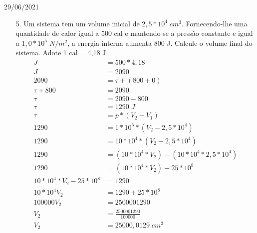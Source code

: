 \documentclass{SchoolBook}
\begin{document}
\begin{day}{29/06/2021}
\begin{enumerate}
            \item[5.] Um sistema tem um volume inicial de $2,5 * 10^4\;cm^3$. Fornecendo-lhe uma quantidade de calor igual a 500 cal e mantendo-se a pressão constante e igual a $1,0 * 10^5\;N/m^2$, a energia interna aumenta 800 J. Calcule o volume final do sistema. Adote 1 cal = 4,18 J.
            \begin{align*}
                                          J &= 500 * 4,18 \\
                                          J &= 2090       \\[3pt]
                                       2090 &= \tau + (800 + 0) \\
                                 \tau + 800 &= 2090             \\
                                       \tau &= 2090 - 800       \\
                                       \tau &= 1290\;J          \\[3pt]
                                       \tau &= p * (V_2 - V_1)                              \\
                                       1290 &= 1 * 10^5 * (V_2 - 2,5 * 10^4)                \\
                                       1290 &= 10 * 10^4 * (V_2 - 2,5 * 10^4)               \\
                                       1290 &= (10 * 10^4 * V_2) - (10 * 10^4 * 2,5 * 10^4) \\
                                       1290 &= (10 * 10^4 * V_2) - 25 * 10^8                \\
                10 * 10^4 * V_2 - 25 * 10^8 &= 1290                                         \\
                              10 * 10^4 V_2 &= 1290 + 25 * 10^8                             \\
                                 100000 V_2 &= 2500001290                                   \\
                                        V_2 &= \frac{2500001290}{100000}                    \\
                                        V_2 &= 25000,0129\;cm^3
            \end{align*}
        \end{enumerate}
    \end{day}
\end{document}
